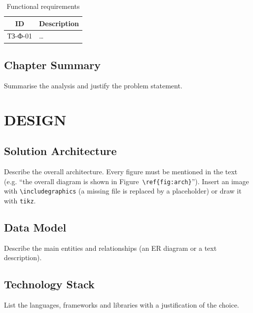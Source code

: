 \documentclass[12pt,a4paper]{extreport}
\begin{document}
\begin{table}[H]
\caption{Functional requirements}
\label{tab:func-req}
\centering
\begin{tabular}{|c|>{\raggedright\arraybackslash}p{11cm}|}
\hline
\textbf{ID} & \textbf{Description} \\
\hline
ТЗ-Ф-01 & \ldots \\
\hline
\end{tabular}
\end{table}

\section{Chapter Summary}
Summarise the analysis and justify the problem statement.

\clearpage

\chapter{DESIGN}
\section{Solution Architecture}
Describe the overall architecture. Every figure must be mentioned in the text
(e.g. \enquote{the overall diagram is shown in Figure~\texttt{\textbackslash ref\{fig:arch\}}}). Insert
an image with \verb|\includegraphics| (a missing file is replaced by a
placeholder) or draw it with \texttt{tikz}.

\section{Data Model}
Describe the main entities and relationships (an ER diagram or a text
description).

\section{Technology Stack}
List the languages, frameworks and libraries with a justification of the choice.
\end{document}
